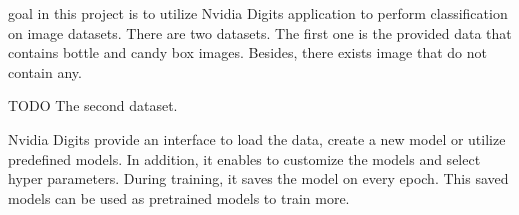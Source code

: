 \documentclass[10pt,journal,compsoc]{IEEEtran}
\begin{document}
 goal in this project is to utilize Nvidia Digits application to perform classification on image datasets. There are two datasets. The first one is the provided data that contains bottle and candy box images. Besides, there exists image that do not contain any. 

TODO The second dataset.

Nvidia Digits provide an interface to load the data, create a new model or utilize predefined models. In addition, it enables to customize the models and select hyper parameters. During training, it saves the model on every epoch. This saved models can be used as pretrained models to train more.







\end{document}
